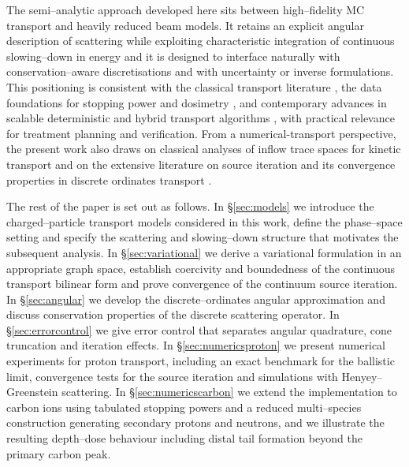 \documentclass[final]{amsart}
\begin{document}
The semi--analytic approach developed here sits between high--fidelity
MC transport and heavily reduced beam models. It retains an explicit
angular description of scattering while exploiting characteristic
integration of continuous slowing--down in energy and it is designed
to interface naturally with conservation--aware discretisations and
with uncertainty or inverse formulations. This positioning is
consistent with the classical transport literature
\cite{case1968linear,lewis1984computational,pomraning1991linear,wilson1988charged},
the data foundations for stopping power and dosimetry
\cite{berger1982stopping,berger1998stopping,international1993stopping,seltzer2016key,sigmund2009errata},
and contemporary advances in scalable deterministic and hybrid
transport algorithms
\cite{yu2025review,stammer2024deterministic,ashby2025efficient,ashby2025positivity,calloo2025cycle},
with practical relevance for treatment planning and verification.
From a numerical-transport perspective, the present work also draws on
classical analyses of inflow trace spaces for kinetic transport
\cite{cessenat1984theoremes,cessenat1985theoremes} and on the
extensive literature on source iteration and its convergence
properties in discrete ordinates transport
\cite{adams2002fast,miller2002convergence}.

The rest of the paper is set out as follows. In \S\ref{sec:models} we
introduce the charged--particle transport models considered in this
work, define the phase--space setting and specify the scattering and
slowing--down structure that motivates the subsequent analysis. In
\S\ref{sec:variational} we derive a variational formulation in an
appropriate graph space, establish coercivity and boundedness of the
continuous transport bilinear form and prove convergence of the
continuum source iteration. In \S\ref{sec:angular} we develop the
discrete--ordinates angular approximation and discuss conservation
properties of the discrete scattering operator. In
\S\ref{sec:errorcontrol} we give error control that separates angular
quadrature, cone truncation and iteration effects.  In
\S\ref{sec:numericsproton} we present numerical experiments for proton
transport, including an exact benchmark for the ballistic limit,
convergence tests for the source iteration and simulations with
Henyey--Greenstein scattering. In \S\ref{sec:numericscarbon} we extend
the implementation to carbon ions using tabulated stopping powers and
a reduced multi--species construction generating secondary protons and
neutrons, and we illustrate the resulting depth--dose behaviour
including distal tail formation beyond the primary carbon peak.
\end{document}
